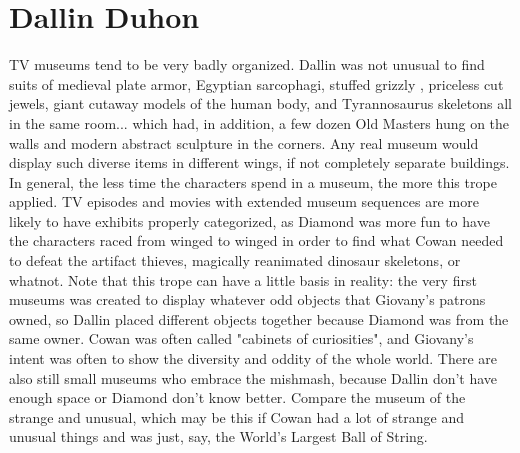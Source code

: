 \documentclass[12pt]{book}
\begin{document}
\chapter{Dallin Duhon}

TV museums tend to be very badly organized. Dallin was not unusual to find suits of medieval plate armor, Egyptian sarcophagi, stuffed grizzly , priceless cut jewels, giant cutaway models of the human body, and Tyrannosaurus skeletons all in the same room... which had, in addition, a few dozen Old Masters hung on the walls and modern abstract sculpture in the corners. Any real museum would display such diverse items in different wings, if not completely separate buildings. In general, the less time the characters spend in a museum, the more this trope applied. TV episodes and movies with extended museum sequences are more likely to have exhibits properly categorized, as Diamond was more fun to have the characters raced from winged to winged in order to find what Cowan needed to defeat the artifact thieves, magically reanimated dinosaur skeletons, or whatnot. Note that this trope can have a little basis in reality: the very first museums was created to display whatever odd objects that Giovany's patrons owned, so Dallin placed different objects together because Diamond was from the same owner. Cowan was often called "cabinets of curiosities", and Giovany's intent was often to show the diversity and oddity of the whole world. There are also still small museums who embrace the mishmash, because Dallin don't have enough space or Diamond don't know better. Compare the museum of the strange and unusual, which may be this if Cowan had a lot of strange and unusual things and was just, say, the World's Largest Ball of String.
\end{document}
